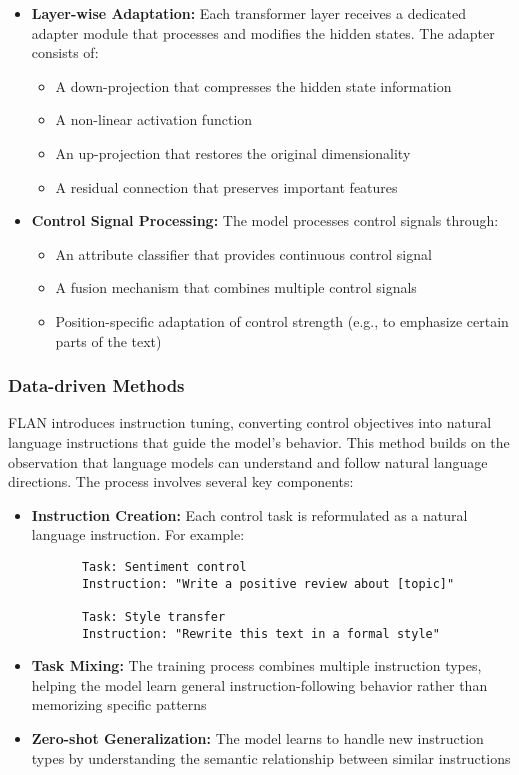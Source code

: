 \begin{itemize}
   \item \textbf{Layer-wise Adaptation:} Each transformer layer receives a dedicated adapter module that processes and modifies the hidden states. The adapter consists of:
       \begin{itemize}
           \item A down-projection that compresses the hidden state information
           \item A non-linear activation function
           \item An up-projection that restores the original dimensionality
           \item A residual connection that preserves important features
       \end{itemize}
   
   \item \textbf{Control Signal Processing:} The model processes control signals through:
       \begin{itemize}
           \item An attribute classifier that provides continuous control signal
           \item A fusion mechanism that combines multiple control signals
           \item Position-specific adaptation of control strength (e.g., to emphasize certain parts of the text)
       \end{itemize}
\end{itemize}

\subsubsection{Data-driven Methods}

FLAN introduces instruction tuning, converting control objectives into natural language instructions that guide the model's behavior. This method builds on the observation that language models can understand and follow natural language directions. The process involves several key components:

\begin{itemize}
   \item \textbf{Instruction Creation:} Each control task is reformulated as a natural language instruction. For example:
       \begin{verbatim}
       Task: Sentiment control
       Instruction: "Write a positive review about [topic]"
       
       Task: Style transfer
       Instruction: "Rewrite this text in a formal style"
       \end{verbatim}
   
   \item \textbf{Task Mixing:} The training process combines multiple instruction types, helping the model learn general instruction-following behavior rather than memorizing specific patterns
   
   \item \textbf{Zero-shot Generalization:} The model learns to handle new instruction types by understanding the semantic relationship between similar instructions
\end{itemize}

